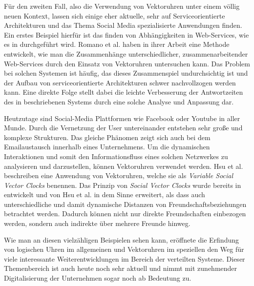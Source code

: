 Für den zweiten Fall, also die Verwendung von Vektoruhren unter einem völlig neuen Kontext, lassen sich einige eher aktuelle, sehr auf Serviceorientierte Architekturen und das Thema Social Media spezialisierte Anwendungen finden.
Ein erstes Beispiel hierfür ist das finden von Abhängigkeiten in Web-Services, wie es in \cite{Romano2011} durchgeführt wird. Romano et al. haben in ihrer Arbeit eine Methode entwickelt, wie man die Zusammenhänge unterschiedlicher, zusammenarbeitender Web-Services durch den Einsatz von Vektoruhren untersuchen kann. Das Problem bei solchen Systemen ist häufig, das dieses Zusammenspiel undurchsichtig ist und der Aufbau von serviceorientierte Architekturen schwer nachvollzogen werden kann. Eine direkte Folge stellt dabei die leichte Verbesserung der Antwortzeiten des in \cite{Romano2011} beschriebenen Systems durch eine solche Analyse und Anpassung dar.

Heutzutage sind Social-Media Plattformen wie Facebook oder Youtube in aller Munde. Durch die Vernetzung der User untereinander entstehen sehr große und komplexe Strukturen. Das gleiche Phänomen zeigt sich auch bei dem Emailaustausch innerhalb eines Unternehmens. Um die dynamischen Interaktionen und somit den Informationsfluss eines solchen Netzwerkes zu analysieren und darzustellen, können Vektoruhren verwendet werden. Hsu et al. \cite{Hsu2014} beschreiben eine Anwendung von Vektoruhren, welche sie als \textit{Variable Social Vector Clocks} benennen. Das Prinzip von \textit{Social Vector Clocks} wurde bereits in \cite{Kossinets2008} entwickelt und von Hsu et al. in dem Sinne erweitert, als dass auch unterschiedliche und damit dynamische Distanzen von Freundschaftsbeziehungen betrachtet werden. Dadurch können nicht nur direkte Freundschaften einbezogen werden, sondern auch indirekte über mehrere Freunde hinweg.

Wie man an diesen vielzähligen Beispielen sehen kann, eröffnete die Erfindung von logischen Uhren im allgemeinen und Vektoruhren im speziellen den Weg für viele interessante Weiterentwicklungen im Bereich der verteilten Systeme. Dieser Themenbereich ist auch heute noch sehr aktuell und nimmt mit zunehmender Digitalisierung der Unternehmen sogar noch ab Bedeutung zu.